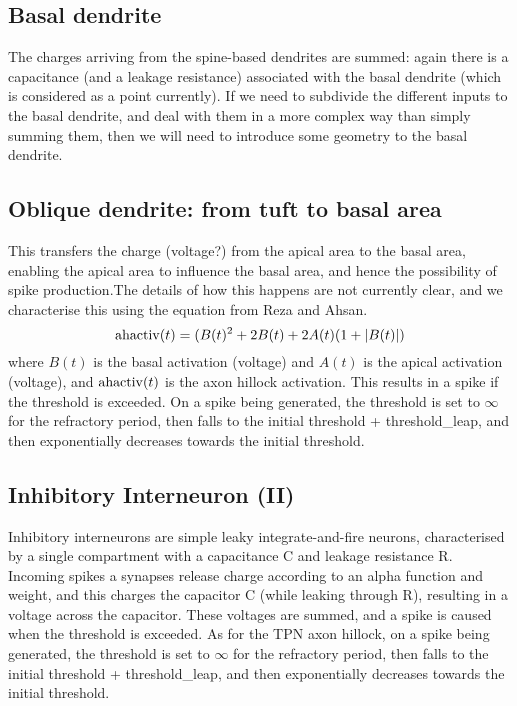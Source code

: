 \documentclass[11pt, oneside]{article}   	%
\begin{document}
\subsection{Basal dendrite}
The charges arriving from the spine-based dendrites are summed: again there is a capacitance (and a leakage resistance) associated with the basal dendrite (which is considered as a point currently). If we need to subdivide the different inputs to the basal dendrite, and deal with them in a more complex way than simply summing them, then we will need to introduce some geometry to the basal dendrite. 


\subsection{Oblique dendrite: from tuft to basal area}
This transfers the charge (voltage?) from the apical area to the basal area, enabling the apical area to influence the basal area, and hence the possibility of spike production.The details of how this happens are not currently clear, and we characterise this using the equation from Reza and Ahsan.
\begin{equation}
{\rm ahactiv}(t) = (B(t)^2 + 2 B(t) + 2 A(t)  (1 + |B(t)|)
\end{equation}
where $B(t)$ is the basal activation (voltage) and $A(t)$ is the apical activation (voltage), and ${\rm ahactiv}(t)$ is the axon hillock activation. This results in a spike if the threshold is exceeded. On a spike being generated, the threshold is set to $\infty $ for the refractory period, then falls to the initial threshold + threshold\_leap, and then exponentially decreases towards the initial threshold. 

\subsection{Inhibitory Interneuron (II)}
Inhibitory interneurons are simple leaky integrate-and-fire neurons, characterised by a single compartment with a capacitance C and leakage resistance R. Incoming spikes a synapses release charge according to an alpha function and weight, and this charges the capacitor C (while leaking through R), resulting in a voltage across the capacitor. These voltages are summed, and a spike is caused when the threshold is exceeded. As for the TPN axon hillock, on a spike being generated, the threshold is set to $\infty $ for the refractory period, then falls to the initial threshold + threshold\_leap, and then exponentially decreases towards the initial threshold. 
\end{document}
